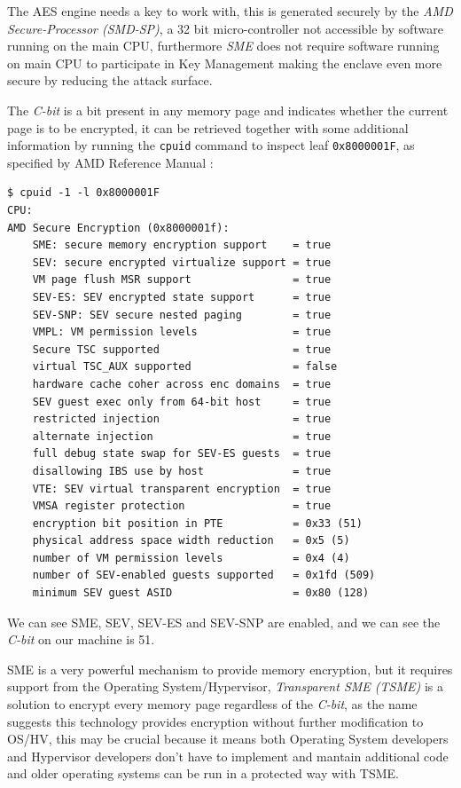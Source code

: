 \documentclass[twocolumn]{article}
\begin{document}
The AES engine needs a key to work with, this is generated securely by the \textit{AMD Secure-Processor (SMD-SP)}, a 32 bit micro-controller not accessible by software running on the main CPU, furthermore \textit{SME} does not require software running on main CPU to participate in Key Management making the enclave even more secure by reducing the attack surface.

The \textit{C-bit} is a bit present in any memory page and indicates whether the current page is to be encrypted, it can be retrieved together with some additional information by running the \texttt{cpuid} command to inspect leaf \texttt{0x8000001F}, as specified by AMD Reference Manual \cite{architecture-reference}:

\begin{verbatim}
$ cpuid -1 -l 0x8000001F
CPU:
AMD Secure Encryption (0x8000001f):
    SME: secure memory encryption support    = true
    SEV: secure encrypted virtualize support = true
    VM page flush MSR support                = true
    SEV-ES: SEV encrypted state support      = true
    SEV-SNP: SEV secure nested paging        = true
    VMPL: VM permission levels               = true
    Secure TSC supported                     = true
    virtual TSC_AUX supported                = false
    hardware cache coher across enc domains  = true
    SEV guest exec only from 64-bit host     = true
    restricted injection                     = true
    alternate injection                      = true
    full debug state swap for SEV-ES guests  = true
    disallowing IBS use by host              = true
    VTE: SEV virtual transparent encryption  = true
    VMSA register protection                 = true
    encryption bit position in PTE           = 0x33 (51)
    physical address space width reduction   = 0x5 (5)    
    number of VM permission levels           = 0x4 (4)
    number of SEV-enabled guests supported   = 0x1fd (509)
    minimum SEV guest ASID                   = 0x80 (128)
\end{verbatim}

We can see SME, SEV, SEV-ES and SEV-SNP are enabled, and we can see the \textit{C-bit} on our machine is 51.

SME is a very powerful mechanism to provide memory encryption, but it requires support from the Operating System/Hypervisor, \textit{Transparent SME (TSME)} is a solution to encrypt every memory page regardless of the \textit{C-bit}, as the name suggests this technology provides encryption without further modification to OS/HV, this may be crucial because it means both Operating System developers and Hypervisor developers don't have to implement and mantain additional code and older operating systems can be run in a protected way with TSME.
\end{document}
